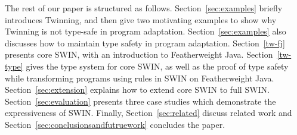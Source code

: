 The rest of our paper is structured as follows. Section~\ref{sec:examples}
briefly introduces Twinning, and then give two motivating examples to show why Twinning 
is not type-safe in program adaptation. 
Section~\ref{sec:examples} also discusses how to maintain type safety 
in program adaptation. 
Section~\ref{tw-fj} presents core SWIN, with an introduction to
Featherweight Java.
Section~\ref{tw-type} gives the type system for core SWIN, as well as the proof of type safety while transforming programs using rules in SWIN  
on Featherweight Java.
Section~\ref{sec:extension} explains how to extend core SWIN to full SWIN.
Section~\ref{sec:evaluation} presents three case studies which
demonstrate the expressiveness of SWIN.
Finally, Section~\ref{sec:related} discuss related work and
Section~\ref{sec:conclusionsandfutruework} concludes the paper.


